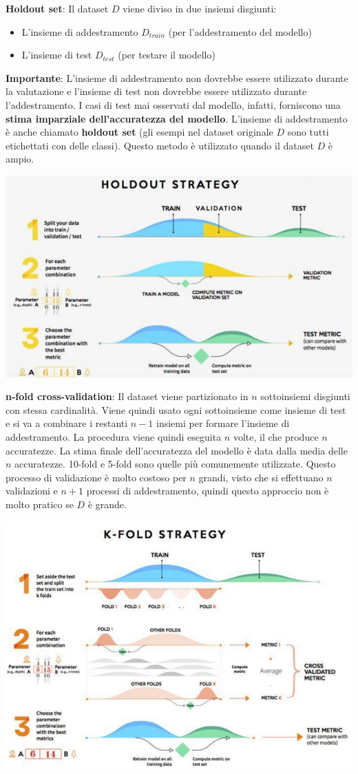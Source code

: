 \documentclass[12pt]{article}
\begin{document}
\textbf{Holdout set}: \newline
Il dataset $D$ viene diviso in due insiemi disgiunti:
\begin{itemize}
    \item L'insieme di addestramento $D_{train}$ (per l'addestramento del modello)
    \item L'insieme di test $D_{test}$ (per testare il modello)
\end{itemize}
\textbf{Importante}: L'insieme di addestramento non dovrebbe essere utilizzato durante la valutazione e l'insieme di test non dovrebbe essere utilizzato durante l'addestramento. I casi di test mai osservati dal modello, infatti,
forniscono una \textbf{stima imparziale dell'accuratezza del modello}. \newline
L'insieme di addestramento è anche chiamato \textbf{holdout set} (gli esempi nel dataset originale $D$ sono tutti etichettati con delle classi).
Questo metodo è utilizzato quando il dataset $D$ è ampio.
\begin{center}
    \includegraphics[width =0.80\linewidth]{Images/77.PNG}
\end{center}
\textbf{n-fold cross-validation}: \newline
Il dataset viene partizionato in $n$ sottoinsiemi disgiunti con stessa cardinalità.
Viene quindi usato ogni sottoinsieme come insieme di test e si va a combinare i restanti $n-1$ insiemi per formare l'insieme di addestramento.
La procedura viene quindi eseguita $n$ volte, il che produce $n$ accuratezze.
La stima finale dell'accuratezza del modello è data dalla media delle $n$ accuratezze.
10-fold e 5-fold sono quelle più comunemente utilizzate.
Questo processo di validazione è molto costoso per $n$ grandi, visto che si effettuano $n$ validazioni e $n+1$ processi di addestramento, quindi questo approccio non è molto pratico se $D$ è grande.
\begin{center}
    \includegraphics[width =0.70\linewidth]{Images/78.PNG}
\end{center}
\end{document}
